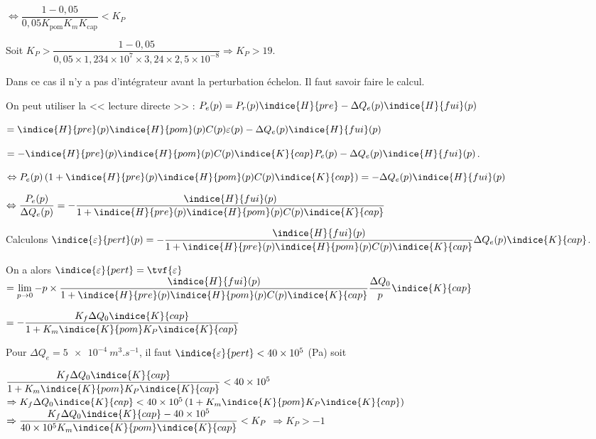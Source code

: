 $ \Leftrightarrow \dfrac{1 - 0,05}{0,05 K_{\text{pom}} K_m K_{\text{cap}}}<K_P $

Soit $ K_P > \dfrac{1 - 0,05}{0,05 \times 1,234 \times 10^7\times 3,24 \times  2,5 \times 10^{-8}}  \Rightarrow K_P > 19$.
\else 
\fi

\ifprof
Dans ce cas il n'y a pas d'intégrateur avant la perturbation échelon. Il faut savoir faire le calcul.

On peut utiliser la << lecture directe >> :
$P_e(p)= P_r(p)\indice{H}{pre} - \Delta Q_e(p) \indice{H}{fui}(p)$

$= \indice{H}{pre}(p)\indice{H}{pom}(p) C(p) \varepsilon(p)- \Delta Q_e(p) \indice{H}{fui}(p)$

$= -\indice{H}{pre}(p)\indice{H}{pom}(p) C(p) \indice{K}{cap} P_e(p)- \Delta Q_e(p) \indice{H}{fui}(p)$.

$\Leftrightarrow P_e(p) \left(1+\indice{H}{pre}(p)\indice{H}{pom}(p) C(p) \indice{K}{cap} \right)
=- \Delta Q_e(p) \indice{H}{fui}(p)$

$\Leftrightarrow \dfrac{P_e(p)}{\Delta Q_e(p)} 
=-  \dfrac{\indice{H}{fui}(p)}{1+\indice{H}{pre}(p)\indice{H}{pom}(p) C(p) \indice{K}{cap}}$


Calculons $\indice{\varepsilon}{pert}(p) = -  \dfrac{\indice{H}{fui}(p)}{1+\indice{H}{pre}(p)\indice{H}{pom}(p) C(p) \indice{K}{cap}} \Delta Q_e(p) \indice{K}{cap}$.

On a alors $\indice{\varepsilon}{pert}= \tvf{\varepsilon}$ 
$= \lim\limits_{p\to 0} - p\times  \dfrac{\indice{H}{fui}(p)}{1+\indice{H}{pre}(p)\indice{H}{pom}(p) C(p) \indice{K}{cap}} \dfrac{\Delta Q_0}{p} \indice{K}{cap}$

$= - \dfrac{K_f\Delta Q_0 \indice{K}{cap}}{1+K_m\indice{K}{pom} K_P \indice{K}{cap}} $

\else 
\fi

\ifprof
Pour $\Delta Q_e = \SI{5e-4}{m^3.s^{-1}}$, il faut $\indice{\varepsilon}{pert}<40\times 10^5$ (Pa) soit

$\dfrac{K_f\Delta Q_0 \indice{K}{cap} }{1+K_m\indice{K}{pom} K_P \indice{K}{cap}}  < 40\times 10^5$
$\Rightarrow  K_f\Delta Q_0 \indice{K}{cap}  < 40\times 10^5\left(1+K_m\indice{K}{pom} K_P \indice{K}{cap}\right)$
$\Rightarrow \dfrac{K_f\Delta Q_0 \indice{K}{cap}  -40\times 10^5}{40\times 10^5 K_m\indice{K}{pom} \indice{K}{cap} }< K_P $
$\Rightarrow K_P > -1$
\else 
\fi

